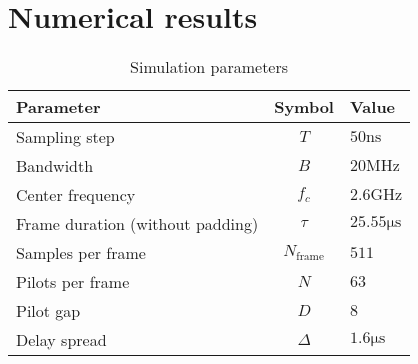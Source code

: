 \documentclass[journal,10pt]{IEEEtran}
\renewcommand{\arraystretch}{1.2}
\newcommand{\ra}[1]{\renewcommand{\arraystretch}{#1}}
\begin{document}
\section{Numerical results}
\begin{table}[t]\centering \ra{1.3}\caption{Simulation parameters}
\begin{tabular}{@{}lcl@{}}\toprule
\textbf{Parameter}& \textbf{Symbol}& \textbf{Value}\\\midrule
 Sampling step &$T$&$50\mathrm{ns}$\\ 
 Bandwidth & $B$& $20\mathrm{MHz}$\\
 Center frequency & $f_c$ & $2.6\mathrm{GHz}$\\ 
 Frame duration (without padding)& $\tau$& $25.55\mathrm{\mu s}$\\
 Samples per frame &$N_{\text{frame}}$& $511$\\
 Pilots per frame &$N$&$63$\\
 Pilot gap &$D$&$8$\\
 Delay spread & $\Delta$ & $1.6\mathrm{\mu s}$\\\bottomrule
\end{tabular}
 \label{tabl:rxspec}
\end{table}
\end{document}
